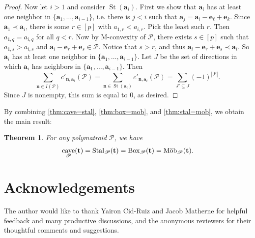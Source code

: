 \documentclass[a4paper, 11pt]{amsart}
\newtheorem{theorem}{Theorem}[section]
\theoremstyle{definition}
\newcommand{\bfn}{\mathbf{n}}
\newcommand{\bft}{\mathbf{t}}
\newcommand{\bfa}{\mathbf{a}}
\newcommand{\bfe}{\mathbf{e}}
\newcommand{\sP}{\mathscr{P}}
\DeclareMathOperator{\St}{St}
\DeclareMathOperator{\cave}{cave}
\begin{document}
\begin{proof}
Now let $i>1$ and consider $\St(\bfa_i)$. First we show that $\bfa_i$ has at least one neighbor in $\{\bfa_1, \ldots, \bfa_{i-1}\}$, i.e. there is $j<i$ such that $\bfa_j = \bfa_i - \bfe_{\ell}+\bfe_k$. Since $\bfa_1 \prec \bfa_i$, there is some $r \in [p]$ with $a_{1,r} < a_{i,r}$. Pick the least such $r$. Then $a_{1,q} = a_{i,q}$ for all $q < r$. Now by M-convexity of $\sP$, there exists $s \in [p]$ such that $a_{1,s} > a_{i,s}$ and $\bfa_i - \bfe_r + \bfe_s \in \sP$. Notice that $s > r$, and thus $\bfa_i-\bfe_r+\bfe_s \prec \bfa_i$. So $\bfa_i$ has at least one neighbor in $\{\bfa_1, \ldots, \bfa_{i-1}\}$. Let $J$ be the set of directions in which $\bfa_i$ has neighbors in $\{\bfa_1, \ldots, \bfa_{i-1}\}$. Then 
\[\sum_{\bfn \in I(\sP)} c'_{\bfn, \bfa_i}(\sP) = \sum_{\bfn \in \St(\bfa_i)} c'_{\bfn, \bfa_i}(\sP) = \sum_{J' \subseteq J} (-1)^{|J'|}.\]
Since $J$ is nonempty, this sum is equal to 0, as desired. 

\end{proof}

By combining \autoref{thm:cave=stal}, \autoref{thm:box=mob}, and \autoref{thm:stal=mob}, we obtain the main result: 

\begin{theorem}
    For any polymatroid $\sP$, we have 
    \[\cave_{\sP}(\bft) = {\rm Stal}_{\sP}(\bft) = {\rm Box}_{\sP}(\bft) = \text{\rm M\"ob}_{\sP}(\bft).\]
\end{theorem}


\section*{Acknowledgements}
The author would like to thank Yairon Cid-Ruiz and Jacob Matherne for helpful feedback and many productive discussions, and the anonymous reviewers for their thoughtful comments and suggestions. 




\end{document}
